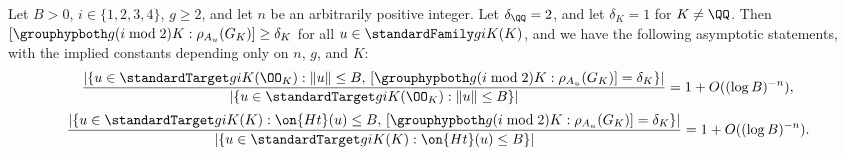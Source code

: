 \begin{theorem}\label{mainbldg}	
Let $B> 0$, $i \in \{1,2,3,4\}$, $g \geq 2$, and let $n$ be an arbitrarily positive integer. Let $\delta_\QQ = 2$, and let $\delta_K = 1$ for $K \neq \QQ$. Then $[ \grouphypboth g {(i \bmod 2)}{K} : \rho_{A_u}(G_K) ] \geq \delta_K$
for all $u \in \standardFamily g i K(K)$, 
and we have the following asymptotic statements, with the implied constants depending only on $n$, $g$, and $K$:
			\[
				\frac{|\{u \in \standardTarget g i K(\OO_K) : \lVert u \rVert \le B,\, [ \grouphypboth g {(i \bmod 2)}{K} : \rho_{A_u}(G_K) ] = \delta_K \}|}{|\{u \in \standardTarget g i K(\OO_K): \lVert u \rVert \le B\}|} = 1 + O((\log B)^{-n}),
			\]
\[
	\frac{|\{u \in \standardTarget g i K(K) : \on{Ht}(u) \leq B,\, [ \grouphypboth g {(i \bmod 2)}{K} : \rho_{A_u}(G_K) ] = \delta_K \}|}{|\{u \in \standardTarget g i K(K) : \on{Ht}(u) \le B\}|} = 1 + O((\log B)^{-n}). 
			\]
\begin{comment}
Let $B, n > 0, g \geq 2$ and $1 \leq i \leq 4$.
Then we have the following asymptotic statements: 
\begin{enumerate}
	\item[\customlabel{main-not-q}{(a)}] If $K \neq \mathbb Q$, then 
			\[
				\frac{|\{u \in \standardTarget g i K(K) \cap \mathcal{O}_K^r : \lVert u \rVert \le B,\, \mono_{A_u} = \grouphypboth g {(i \bmod 2)} \}|}{|\{u \in \standardTarget g i K(K) \cap \mc{O}_K^r : \lVert u \rVert \le B\}|} = 1 + O((\log B)^{-n}), \text{ and} 
			\]
\[
	\frac{|\{u \in \standardTarget g i K(K) : \on{Ht}(u) \leq B,\, \mono_{A_u} = \grouphypboth g {(i \bmod 2)} K\}|}{|\{u \in \standardTarget g i K(K) : \on{Ht}(u) \le B\}|} = 1 + O((\log B)^{-n}). 
			\]
		\item[\customlabel{main-q}{(b)}] If $K = \mathbb Q$, then 
			\[
				\frac{\left| \left\{ u \in \standardTarget g i {\mathbb Q}(\mathbb Q) \cap \bz^r : \lVert u \rVert \le B, \, \left[ \grouphypboth g {(i \bmod 2)} {\mathbb Q} : \mono_{A_u} \right] = 2 \right\} \right|}{|\{u \in \bz^r : \lVert u \rVert \le B\}|} = 1 + O((\log B)^{-n}), \text{ and}

\end{comment}
\end{theorem}
